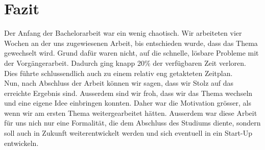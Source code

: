 \section{Fazit}
Der Anfang der Bachelorarbeit war ein wenig chaotisch. Wir arbeiteten vier Wochen an der uns zugewiesenen Arbeit, bis entschieden wurde, dass das Thema gewechselt wird. Grund dafür waren nicht, auf die schnelle, lösbare Probleme mit der Vorgängerarbeit. Dadurch ging knapp 20\% der verfügbaren Zeit verloren. Dies führte schlussendlich auch zu einem relativ eng getakteten Zeitplan. \\


Nun, nach Abschluss der Arbeit können wir sagen, dass wir Stolz auf das erreichte Ergebnis sind. Ausserdem sind wir froh, dass wir das Thema wechseln und eine eigene Idee einbringen konnten. Daher war die Motivation grösser, als wenn wir am ersten Thema weitergearbeitet hätten. Ausserdem war diese Arbeit für uns nich nur eine Formalität, die dem Abschluss des Studiums diente, sondern soll auch in Zukunft weiterentwickelt werden und sich eventuell in ein Start-Up entwickeln.

